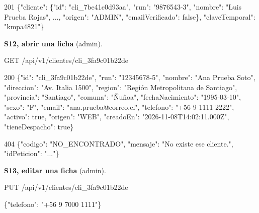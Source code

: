 \begin{codigo}
201 \{"cliente":\allowbreak{} \{"id":\allowbreak{} "cli\_\allowbreak{}7be41c0d93aa",\allowbreak{} "run":\allowbreak{} "9876543-\allowbreak{}3",\allowbreak{} "nombre":\allowbreak{} "Luis Prueba Rojas",\allowbreak{} .\allowbreak{}.\allowbreak{}.\allowbreak{},\allowbreak{} "origen":\allowbreak{} "ADMIN",\allowbreak{} "emailVerificado":\allowbreak{} false\},\allowbreak{} "claveTemporal":\allowbreak{} "kmpa4821"\}\par
\end{codigo}

\textbf{S12, abrir una ficha} (admin).


\begin{codigo}
GET /\allowbreak{}api/\allowbreak{}v1/\allowbreak{}clientes/\allowbreak{}cli\_\allowbreak{}3fa9c01b22de\par
\end{codigo}

\begin{codigo}
200 \{"id":\allowbreak{} "cli\_\allowbreak{}3fa9c01b22de",\allowbreak{} "run":\allowbreak{} "12345678-\allowbreak{}5",\allowbreak{} "nombre":\allowbreak{} "Ana Prueba Soto",\allowbreak{} "direccion":\allowbreak{} "Av.\allowbreak{} Italia 1500",\allowbreak{} "region":\allowbreak{} "Región Metropolitana de Santiago",\allowbreak{} "provincia":\allowbreak{} "Santiago",\allowbreak{} "comuna":\allowbreak{} "Ñuñoa",\allowbreak{} "fechaNacimiento":\allowbreak{} "1995-\allowbreak{}03-\allowbreak{}10",\allowbreak{} "sexo":\allowbreak{} "F",\allowbreak{} "email":\allowbreak{} "ana.\allowbreak{}prueba@correo.\allowbreak{}cl",\allowbreak{} "telefono":\allowbreak{} "+56 9 1111 2222",\allowbreak{} "activo":\allowbreak{} true,\allowbreak{} "origen":\allowbreak{} "WEB",\allowbreak{} "creadoEn":\allowbreak{} "2026-\allowbreak{}11-\allowbreak{}08T14:\allowbreak{}02:\allowbreak{}11.\allowbreak{}000Z",\allowbreak{} "tieneDespacho":\allowbreak{} true\}\par
404 \{"codigo":\allowbreak{} "NO\_\allowbreak{}ENCONTRADO",\allowbreak{} "mensaje":\allowbreak{} "No existe ese cliente.\allowbreak{}",\allowbreak{} "idPeticion":\allowbreak{} ".\allowbreak{}.\allowbreak{}.\allowbreak{}"\}\par
\end{codigo}

\textbf{S13, editar una ficha} (admin).


\begin{codigo}
PUT /\allowbreak{}api/\allowbreak{}v1/\allowbreak{}clientes/\allowbreak{}cli\_\allowbreak{}3fa9c01b22de\par
\{"telefono":\allowbreak{} "+56 9 7000 1111"\}\par
\end{codigo}

